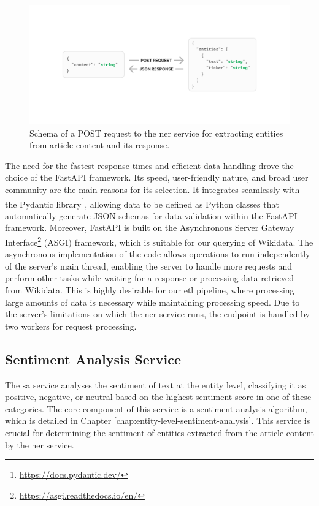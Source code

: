 \begin{figure}[ht]
    \centering
    \includegraphics[width=\textwidth]{img/architecture/ner-req-res.pdf}
    \caption{Schema of a POST request to the \acrshort{ner} service for extracting entities from article content and its response.}
    \label{fig:architecture-ner-req-res}
\end{figure}

The need for the fastest response times and efficient data handling drove the choice of the FastAPI framework. Its speed, user-friendly nature, and broad user community are the main reasons for its selection. It integrates seamlessly with the Pydantic library\footnote{\href{https://docs.pydantic.dev/}{https://docs.pydantic.dev/}}, allowing data to be defined as Python classes that automatically generate JSON schemas for data validation within the FastAPI framework. Moreover, FastAPI is built on the Asynchronous Server Gateway Interface\footnote{\href{https://asgi.readthedocs.io/en/}{https://asgi.readthedocs.io/en/}} (ASGI) framework, which is suitable for our querying of Wikidata. The asynchronous implementation of the code allows operations to run independently of the server's main thread, enabling the server to handle more requests and perform other tasks while waiting for a response or processing data retrieved from Wikidata. This is highly desirable for our \acrshort{etl} pipeline, where processing large amounts of data is necessary while maintaining processing speed. Due to the server's limitations on which the \acrshort{ner} service runs, the endpoint is handled by two workers for request processing.

\subsection{Sentiment Analysis Service}
\label{subsec:architecture-sa}
The \acrshort{sa} service analyses the sentiment of text at the entity level, classifying it as positive, negative, or neutral based on the highest sentiment score in one of these categories. The core component of this service is a sentiment analysis algorithm, which is detailed in Chapter \ref{chap:entity-level-sentiment-analysis}. This service is crucial for determining the sentiment of entities extracted from the article content by the \acrshort{ner} service.

